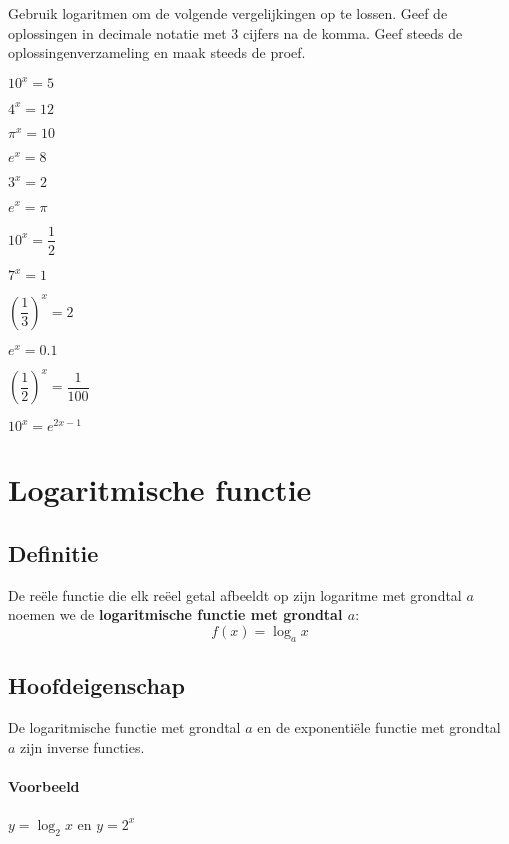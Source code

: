 \documentclass[12pt,twoside,a4paper]{article}
\begin{document}
\begin{oefening} %
Gebruik logaritmen om de volgende vergelijkingen op te lossen. Geef de oplossingen in decimale notatie met 3 cijfers na de komma. Geef steeds de oplossingenverzameling en maak steeds de proef.
\begin{exlist}{2}
  \item $10^x=5$
  \item $4^x=12$
  \item $\pi^x=10$
  \item $e^x=8$
  \item $3^x=2$
  \item $e^x=\pi$
  \item $10^x=\dfrac{1}{2}$
  \item $7^x=1$
  \item $\left(\dfrac{1}{3}\right)^x=2$
  \item $e^x=0.1$
  \item $\left(\dfrac{1}{2}\right)^x=\dfrac{1}{100}$
  \item $10^x=e^{2x-1}$
\end{exlist}
\end{oefening}

\cleardoublepage
\section{Logaritmische functie}

\subsection{Definitie}
De reële functie die elk reëel getal afbeeldt op zijn logaritme met grondtal $a$ noemen we de {\bf logaritmische functie met grondtal $a$}:
$$f(x) = \log_a x$$

\subsection{Hoofdeigenschap}

\begin{mdframed}
De logaritmische functie met grondtal $a$ en de exponentiële functie met grondtal $a$ zijn inverse functies.
\end{mdframed}

\paragraph{Voorbeeld} $y=\log_2 x$ en $y=2^x$
\end{document}
